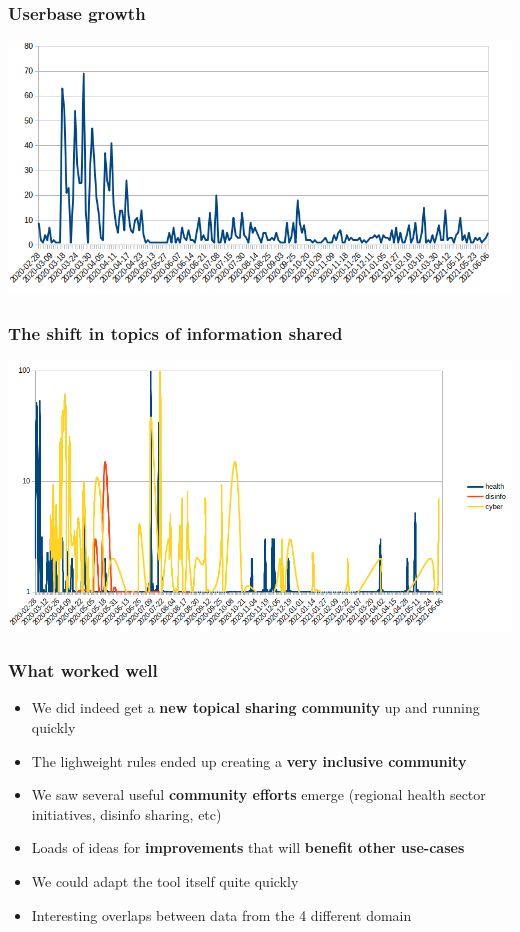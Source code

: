 \begin{frame}
 \frametitle{Userbase growth}
 \includegraphics[width=1\linewidth]{user_regs_daily.png}
\end{frame}

\begin{frame}
 \frametitle{The shift in topics of information shared}
 \includegraphics[width=1.00\linewidth]{topics_of_sharing_daily.png}
\end{frame}

\begin{frame}
 \frametitle{What worked well}
 \begin{itemize}
         \item We did indeed get a {\bf new topical sharing community} up and running quickly
         \item The lighweight rules ended up creating a {\bf very inclusive community}
         \item We saw several useful {\bf community efforts} emerge (regional health sector initiatives, disinfo sharing, etc)
         \item Loads of ideas for {\bf improvements} that will {\bf benefit other use-cases}
         \item We could adapt the tool itself quite quickly
         \item Interesting overlaps between data from the 4 different domain
 \end{itemize}
\end{frame}

